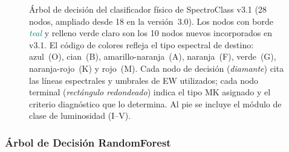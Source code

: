 \documentclass[12pt,a4paper]{article}
\begin{document}
\begin{landscape}
\begin{figure}[p]
  \centering
  \caption[Árbol de decisión de 28 nodos — SpectroClass v3.1]{%
    Árbol de decisión del clasificador físico de SpectroClass v3.1 (28 nodos,
    ampliado desde 18 en la versión~3.0).
    Los nodos con borde \textcolor{teal}{\textit{teal}} y relleno verde claro son los
    10 nodos nuevos incorporados en v3.1.
    El código de colores refleja el tipo espectral de destino:
    azul~(O), cian~(B), amarillo-naranja~(A), naranja~(F),
    verde~(G), naranja-rojo~(K) y rojo~(M).
    Cada nodo de decisión (\textit{diamante}) cita las líneas espectrales y umbrales
    de EW utilizados; cada nodo terminal (\textit{rectángulo redondeado}) indica el
    tipo MK asignado y el criterio diagnóstico que lo determina.
    Al pie se incluye el módulo de clase de luminosidad (I--V).
  }
  \label{fig:arbol}
\end{figure}
\end{landscape}

\subsubsection{Árbol de Decisión RandomForest}
\end{document}
